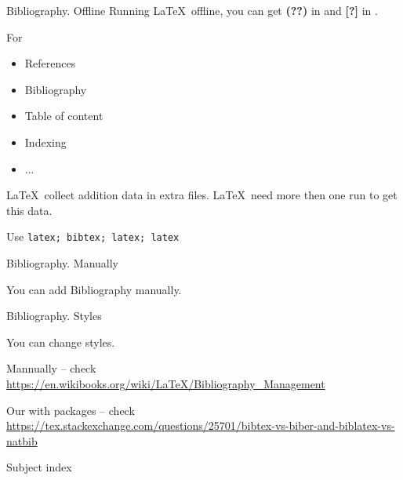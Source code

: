 \begin{frame}[fragile]{Bibliography. Offline\preMagicPage}\relax
Running \LaTeX\ offline, you can get \textbf{(??)} in \ccol{\ref} and \textbf{[?]} in \ccol{\cite}. 

For 
\begin{itemize}
    \item References 
    \item Bibliography
    \item Table of content
    \item Indexing
    \item ...
\end{itemize}

\LaTeX\ collect addition data in extra files. \LaTeX\ need more then one run to get this data. 

Use \verb|latex; bibtex; latex; latex|

\end{frame}

\begin{frame}[fragile]{Bibliography. Manually\magicPage}

You can add Bibliography manually.

\cprotect{}  

\end{frame}

\begin{frame}[fragile]{Bibliography. Styles\magicPage}

You can change styles.

Mannually -- check \url{https://en.wikibooks.org/wiki/LaTeX/Bibliography_Management}

Our with packages -- check \url{https://tex.stackexchange.com/questions/25701/bibtex-vs-biber-and-biblatex-vs-natbib}
\end{frame}

\begin{frame}[fragile]{Subject index\magicPage}\relax
\cprotect{}  

\end{frame}